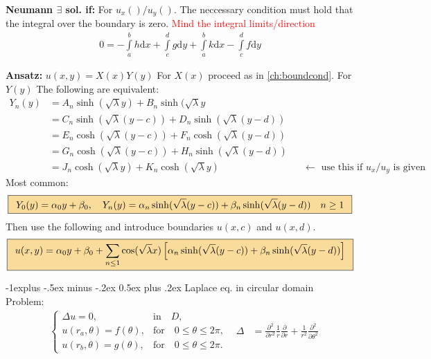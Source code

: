\documentclass[10pt,landscape]{scrartcl}
\makeatletter
\renewcommand{\subsection}{\@startsection{subsection}{2}{0mm}%
                                {-1explus -.5ex minus -.2ex}%
                                {0.5ex plus .2ex}%
                                {\normalfont\normalsize\bfseries}}
\newcommand{\eqbox}[1]{\fcolorbox{black}{formula}{\hspace{0.5em}$\displaystyle#1$\hspace{0.5em}}}
\newcommand{\Int}{\int\limits}
\newcommand\warning{%
 \makebox[1.4em][c]{%
 \makebox[0pt][c]{\raisebox{.1em}{\small!}}%
 \makebox[0pt][c]{\color{red}\Large$\bigtriangleup$}}}%
\makeatother
\begin{document}
\begin{multicols*}{2}
\textbf{Neumann $\exists$ sol. if:} For $u_x()/u_y()$. The neccessary condition must hold that the integral over the boundary is zero. \warning\textcolor{red}{Mind the integral limits/direction}
  \begin{align*}
    0 = -\Int_a^bh\mathrm{d}x+\Int_c^dg\mathrm{d}y+\Int_a^bk\mathrm{d}x-\Int_c^df\mathrm{d}y
  \end{align*}

\textbf{Ansatz:} $u(x,y)=X(x)Y(y)$ For $X(x)$ proceed as in \ref{ch:boundcond}. For $Y(y)$ The following are equivalent:
  \begin{align*}
    Y_n(y) &= A_n \sinh(\sqrt{\lambda}y) + B_n \sinh(\sqrt{\lambda}y & &\\
           &= C_n \sinh(\sqrt{\lambda}(y-c)) + D_n \sinh(\sqrt{\lambda}(y-d)) & &\\
           &= E_n \cosh(\sqrt{\lambda}(y-c)) + F_n \cosh(\sqrt{\lambda}(y-d)) & &\\
           &= G_n \cosh(\sqrt{\lambda}(y-c)) + H_n \sinh(\sqrt{\lambda}(y-d)) & &\\
           &= J_n \cosh(\sqrt{\lambda}y) + K_n \cosh(\sqrt{\lambda}y) & &\leftarrow\text{ use this if $u_x/u_y$ is given}
  \end{align*}
Most common:
\begin{align*}
  \eqbox{Y_0(y) = \alpha_0y+\beta_0, \quad Y_n(y) = \alpha_n \sinh(\sqrt{\lambda}(y-c)) + \beta_n \sinh(\sqrt{\lambda}(y-d)) \quad n \geq 1}
\end{align*}
Then use the following and introduce boundaries $u(x,c)$ and $u(x,d)$.
\begin{align*}
  \eqbox{u(x,y) = \alpha_0y+\beta_0+\sum_{n\leq1}\cos(\sqrt{\lambda}x)\left[\alpha_n\sinh(\sqrt{\lambda}(y-c))+\beta_n\sinh(\sqrt{\lambda}(y-d))\right]}
\end{align*}

\subsection{Laplace eq. in circular domain}
  Problem:
  \begin{align*}
    &\begin{cases}
      \Delta u = 0, & \text{in} \quad D,\\
      u(r_a,\theta) = f(\theta), & \text{for} \quad 0 \leq \theta \leq 2\pi,\\
      u(r_b,\theta) = g(\theta), & \text{for} \quad 0 \leq \theta \leq 2\pi.
    \end{cases}
    &
    \Delta &= \frac{\partial^2}{\partial r^2} \frac{1}{r}\frac{\partial}{\partial r} + \frac{1}{r^2} \frac{\partial^2}{\partial \theta^2}
  \end{align*}


\end{multicols*}
\end{document}
